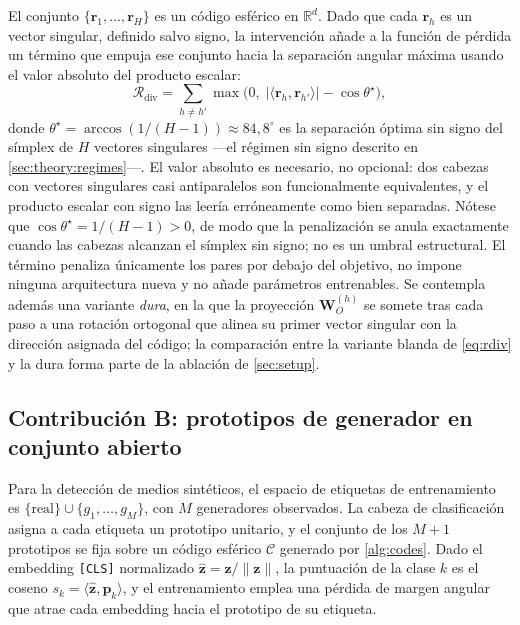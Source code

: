 \documentclass[11pt,a4paper]{article}
\theoremstyle{plain}
\newcommand{\Rset}{\mathbb{R}}
\begin{document}
El conjunto $\{\bm{r}_1,\dots,\bm{r}_H\}$ es un código esférico en
$\Rset^d$. Dado que cada $\bm{r}_h$ es un vector singular, definido
salvo signo, la intervención añade a la función de pérdida un término
que empuja ese conjunto hacia la separación angular máxima usando el
valor absoluto del producto escalar:
\begin{equation}
\mathcal{R}_{\mathrm{div}}
  = \sum_{h\neq h'}
    \max\!\big(0,\;
      \lvert\langle\bm{r}_h,\bm{r}_{h'}\rangle\rvert
      - \cos\theta^\star\big),
\label{eq:rdiv}
\end{equation}
donde $\theta^\star=\arccos(1/(H-1))\approx 84{,}8^\circ$ es la
separación óptima sin signo del símplex de $H$ vectores singulares
---el régimen sin signo descrito en \cref{sec:theory:regimes}---. El
valor absoluto es necesario, no opcional: dos cabezas con vectores
singulares casi antiparalelos son funcionalmente equivalentes, y el
producto escalar con signo las leería erróneamente como bien
separadas. Nótese que $\cos\theta^\star=1/(H-1)>0$, de modo que la
penalización se anula exactamente cuando las cabezas alcanzan el
símplex sin signo; no es un umbral estructural. El término penaliza
únicamente los pares por debajo del objetivo, no impone ninguna
arquitectura nueva y no añade parámetros entrenables. Se contempla
además una variante \emph{dura}, en la que la proyección
$\bm{W}_O^{(h)}$ se somete tras cada paso a una rotación ortogonal que
alinea su primer vector singular con la dirección asignada del código;
la comparación entre la variante blanda de \cref{eq:rdiv} y la dura
forma parte de la ablación de \cref{sec:setup}.

\subsection{Contribución B: prototipos de generador en conjunto abierto}
\label{sec:metB}

Para la detección de medios sintéticos, el espacio de etiquetas de
entrenamiento es $\{\text{real}\}\cup\{g_1,\dots,g_M\}$, con $M$
generadores observados. La cabeza de clasificación asigna a cada
etiqueta un prototipo unitario, y el conjunto de los $M+1$ prototipos se
fija sobre un código esférico $\mathcal{C}$ generado por
\cref{alg:codes}. Dado el embedding \texttt{[CLS]} normalizado
$\hat{\bm{z}}=\bm{z}/\lVert\bm{z}\rVert$, la puntuación de la clase $k$
es el coseno $s_k=\langle\hat{\bm{z}},\bm{p}_k\rangle$, y el
entrenamiento emplea una pérdida de margen angular que atrae cada
embedding hacia el prototipo de su etiqueta.
\end{document}
